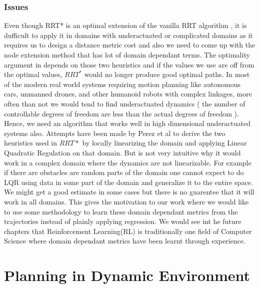 \documentclass[MTech]{iitmdiss}
\begin{document}
\subsection{Issues}
 
 Even though RRT* is an optimal extension of the vanilla RRT algorithm , it is dufficult to apply it in domains with underactuated or complicated domains 
\cite{perez12}
 as it requires us to design a distance metric cost and also we need to come up with the node extension method that has lot of domain dependant terms. The optimality argument in
\cite{karaman11} 
  depends on those two heuristics and if the values we use are off from the optimal values, $RRT^*$ would no longer produce good optimal paths. In most of the modern real world systems requiring motion planning like autonomous cars, unmanned drones, and other humanoid robots with complex linkages, more often than not we would tend to find underactuated dynamics ( the number of controllable degrees of freedom are less than the actual degrees of freedom ). Hence, we need an algorithm that works well in high dimensional underactuated systems also. Attempts have been made by Perez et al
\cite{perez12}
     to derive the two heuristics used in $RRT*$ by locally linearizing the domain and applying Linear Quadratic Regulation on that domain. But is not very intuitive why it would work in a complex domain where the dynamics are not linearizable. For example if there are obstacles are random parts of the domain one cannot expect to do LQR using data in some part of the domain and generalize it to the entire space. We might get a good estimate in some cases but there is no guarentee that it will work in all domains. This gives the motivation to our work where we would like to use some methodology to learn these domain dependant metrics from the trajectories instead of plainly applying regression. We would see int he future chapters that Reinforcement Learning(RL) is traditionally one field of Computer Science where domain dependant metrics have been learnt through experience. 
 
\chapter{Planning in Dynamic Environment} 
\end{document}
